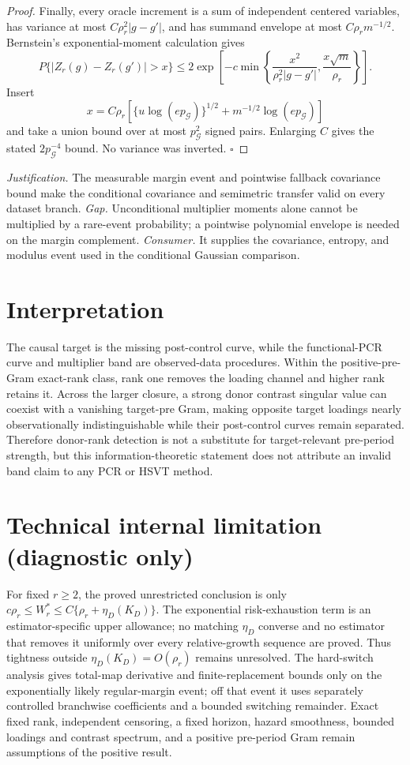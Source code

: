 \documentclass{article}
\begin{document}
\begin{proof}
Finally, every oracle increment is a sum of independent centered variables, has variance at most \(C\rho_r^2|g-g'|\), and has summand envelope at most \(C\rho_rm^{-1/2}\).  Bernstein's exponential-moment calculation gives
\[
 P\{|Z_r(g)-Z_r(g')|>x\}
 \le2\exp\left[-c\min\left\{
 \frac{x^2}{\rho_r^2|g-g'|},
 \frac{x\sqrt m}{\rho_r}\right\}\right].             \tag{16}
\]
Insert
\[
 x=C\rho_r\left[\{u\log(ep_{\mathcal G})\}^{1/2}
 +m^{-1/2}\log(ep_{\mathcal G})\right]
\]
and take a union bound over at most \(p_{\mathcal G}^2\) signed pairs.  Enlarging \(C\) gives the stated \(2p_{\mathcal G}^{-4}\) bound.  No variance was inverted. \(\square\)
\end{proof}
\par\smallskip\noindent \textit{Justification.} The measurable margin event and pointwise fallback covariance bound make the conditional covariance and semimetric transfer valid on every dataset branch. \textit{Gap.} Unconditional multiplier moments alone cannot be multiplied by a rare-event probability; a pointwise polynomial envelope is needed on the margin complement. \textit{Consumer.} It supplies the covariance, entropy, and modulus event used in the conditional Gaussian comparison.

\section{Interpretation}

The causal target is the missing post-control curve, while the functional-PCR curve and multiplier band are observed-data procedures. Within the positive-pre-Gram exact-rank class, rank one removes the loading channel and higher rank retains it. Across the larger closure, a strong donor contrast singular value can coexist with a vanishing target-pre Gram, making opposite target loadings nearly observationally indistinguishable while their post-control curves remain separated. Therefore donor-rank detection is not a substitute for target-relevant pre-period strength, but this information-theoretic statement does not attribute an invalid band claim to any PCR or HSVT method.

\section*{Technical internal limitation (diagnostic only)}

For fixed \(r\ge2\), the proved unrestricted conclusion is only \(c\rho_r\le W_r^*\le C\{\rho_r+\eta_D(K_D)\}\). The exponential risk-exhaustion term is an estimator-specific upper allowance; no matching \(\eta_D\) converse and no estimator that removes it uniformly over every relative-growth sequence are proved. Thus tightness outside \(\eta_D(K_D)=O(\rho_r)\) remains unresolved. The hard-switch analysis gives total-map derivative and finite-replacement bounds only on the exponentially likely regular-margin event; off that event it uses separately controlled branchwise coefficients and a bounded switching remainder. Exact fixed rank, independent censoring, a fixed horizon, hazard smoothness, bounded loadings and contrast spectrum, and a positive pre-period Gram remain assumptions of the positive result.
\end{document}
